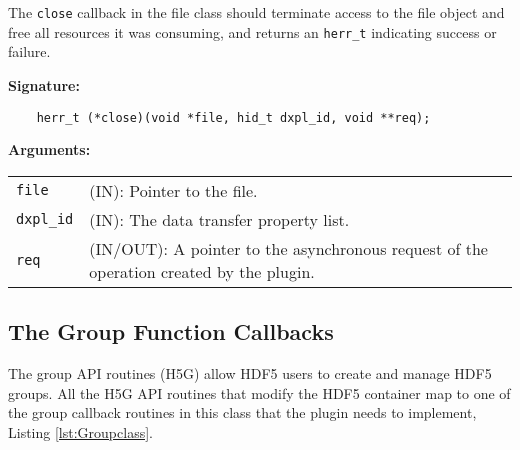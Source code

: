 %
%
%

The \texttt{close} callback in the file class should terminate access to
the file object and free all resources it was consuming, and returns
an \texttt{herr\_t} indicating success or failure.\bigskip\bigskip

\begin{mdframed}[style=bgbox]
\textbf{Signature:}
\begin{lstlisting}
    herr_t (*close)(void *file, hid_t dxpl_id, void **req);
\end{lstlisting}

\textbf{Arguments:}\\
\begin{tabular}{l p{13.5cm}}
  \texttt{file} & (IN): Pointer to the file.\\
  \texttt{dxpl\_id} & (IN): The data transfer property list.\\
  \texttt{req} & (IN/OUT): A pointer to the asynchronous request of the
  operation created by the plugin.\\
\end{tabular}
\end{mdframed}

\subsection{The Group Function Callbacks}
The group API routines (H5G) allow HDF5 users to create and manage
HDF5 groups. All the H5G API routines that modify the HDF5 container
map to one of the group callback routines in this class that the
plugin needs to implement, Listing \ref{lst:Groupclass}.

